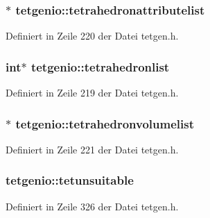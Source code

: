 \hypertarget{classtetgenio_aeae735f4584f63311f1c9d46530eefe1}{
\subsubsection[{tetrahedronattributelist}]{$\ast$ tetgenio\-::tetrahedronattributelist}}\label{classtetgenio_aeae735f4584f63311f1c9d46530eefe1}


Definiert in Zeile 220 der Datei tetgen.\-h.

\hypertarget{classtetgenio_ae53a07184487b2635d0f332ff818d938}{
\subsubsection[{tetrahedronlist}]{\setlength{\rightskip}{0pt plus 5cm}int$\ast$ tetgenio\-::tetrahedronlist}}\label{classtetgenio_ae53a07184487b2635d0f332ff818d938}


Definiert in Zeile 219 der Datei tetgen.\-h.

\hypertarget{classtetgenio_a1fe58bef7f029f7b84a8541851547382}{
\subsubsection[{tetrahedronvolumelist}]{$\ast$ tetgenio\-::tetrahedronvolumelist}}\label{classtetgenio_a1fe58bef7f029f7b84a8541851547382}


Definiert in Zeile 221 der Datei tetgen.\-h.

\hypertarget{classtetgenio_ad57af35c7c480da03af06b1388a4a8f7}{
\subsubsection[{tetunsuitable}]{ tetgenio\-::tetunsuitable}}\label{classtetgenio_ad57af35c7c480da03af06b1388a4a8f7}


Definiert in Zeile 326 der Datei tetgen.\-h.

